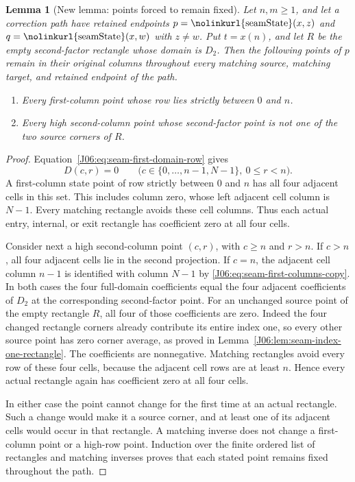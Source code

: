 \documentclass[11pt,oneside]{report}
\newtheorem{lemma}[theorem]{Lemma}
\theoremstyle{definition}
\numberwithin{equation}{section}
\newcommand{\decl}[1]{\textnormal{\nolinkurl{#1}}}
\begin{document}
\begin{lemma}[New lemma: points forced to remain fixed]
\label{J06:lem:seam-second-fixed-points}
Let $n,m\ge1$, and let a correction path have retained endpoints
$p=\decl{seamState}(x,z)$ and $q=\decl{seamState}(x,w)$ with $z\ne w$.
Put $t=x(n)$, and let $R$ be the empty second-factor rectangle whose
domain is $D_2$. Then the following points of $p$ remain in their original
columns throughout every matching source, matching target, and retained
endpoint of the path.
\begin{enumerate}
\item Every first-column point whose row lies strictly between $0$ and $n$.
\item Every high second-column point whose second-factor point is not
one of the two source corners of $R$.
\end{enumerate}
\end{lemma}

\begin{proof}
Equation~\eqref{J06:eq:seam-first-domain-row} gives
\[
 D(c,r)=0\qquad
 \bigl(c\in\{0,\ldots,n-1,N-1\},\ 0\le r<n\bigr).
\]
A first-column state point of row strictly between $0$ and $n$ has
all four adjacent cells in this set. This includes column zero, whose
left adjacent cell column is $N-1$. Every matching rectangle avoids
these cell columns. Thus each actual entry, internal, or exit rectangle
has coefficient zero at all four cells.

Consider next a high second-column point $(c,r)$, with $c\ge n$ and
$r>n$. If $c>n$, all four adjacent cells lie in the second projection.
If $c=n$, the adjacent cell column $n-1$ is identified with column
$N-1$ by \eqref{J06:eq:seam-first-columns-copy}. In both cases the four
full-domain coefficients equal the four adjacent coefficients of $D_2$
at the corresponding second-factor point.
For an unchanged source point of the empty rectangle $R$, all four
of those coefficients are zero. Indeed the four changed rectangle
corners already contribute its entire index one, so every other source
point has zero corner average, as proved in
Lemma~\ref{J06:lem:seam-index-one-rectangle}. The coefficients are
nonnegative. Matching rectangles avoid every row of these four cells,
because the adjacent cell rows are at least $n$. Hence every actual
rectangle again has coefficient zero at all four cells.

In either case the point cannot change for the first time at an actual
rectangle. Such a change would make it a source corner, and at least
one of its adjacent cells would occur in that rectangle. A matching
inverse does not change a first-column point or a high-row point.
Induction over the finite ordered list of rectangles and matching
inverses proves that each stated point remains fixed throughout the path.
\end{proof}
\end{document}
